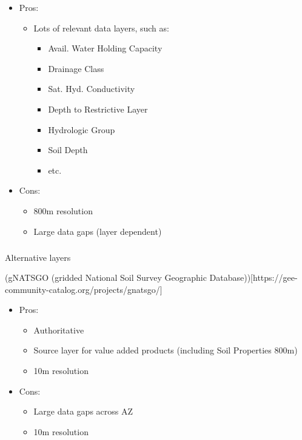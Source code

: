 \documentclass[
]{agujournal2019}
\makeatletter
\let\oldsubparagraph\subparagraph
\renewcommand{\subparagraph}{
    \@ifstar
      \xxxSubParagraphStar
      \xxxSubParagraphNoStar
  }
\newcommand{\xxxSubParagraphStar}[1]{\oldsubparagraph*{#1}\mbox{}}
\newcommand{\xxxSubParagraphNoStar}[1]{\oldsubparagraph{#1}\mbox{}}
\providecommand{\tightlist}{%
  \setlength{\itemsep}{0pt}\setlength{\parskip}{0pt}}\usepackage{longtable,booktabs,array}
\makeatother
\begin{document}
\begin{itemize}
\tightlist
\item
  Pros:

  \begin{itemize}
  \tightlist
  \item
    Lots of relevant data layers, such as:

    \begin{itemize}
    \tightlist
    \item
      Avail. Water Holding Capacity
    \item
      Drainage Class
    \item
      Sat. Hyd. Conductivity
    \item
      Depth to Restrictive Layer
    \item
      Hydrologic Group
    \item
      Soil Depth
    \item
      etc.
    \end{itemize}
  \end{itemize}
\item
  Cons:

  \begin{itemize}
  \tightlist
  \item
    800m resolution
  \item
    Large data gaps (layer dependent)
  \end{itemize}
\end{itemize}

\subparagraph{Alternative layers}\label{alternative-layers}

(gNATSGO (gridded National Soil Survey Geographic
Database)){[}https://gee-community-catalog.org/projects/gnatsgo/{]}

\begin{itemize}
\tightlist
\item
  Pros:

  \begin{itemize}
  \tightlist
  \item
    Authoritative
  \item
    Source layer for value added products (including Soil Properties
    800m)
  \item
    10m resolution
  \end{itemize}
\item
  Cons:

  \begin{itemize}
  \tightlist
  \item
    Large data gaps across AZ
  \item
    10m resolution
  \end{itemize}
\end{itemize}
\end{document}
